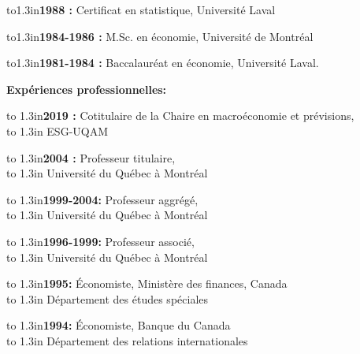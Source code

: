 \noindent\hbox to1.3in{\bf 1988 :\hfill} Certificat en statistique, Universit\'e Laval

\noindent\hbox to1.3in{\bf1984-1986 :\hfill} M.Sc. en \'economie, Universit\'e de Montr\'eal

\noindent\hbox to1.3in{\bf1981-1984 :\hfill} Baccalaur\'eat en \'economie, Universit\'e Laval.

\vspace{.5 cm}



\centerline{\bf Exp\'eriences professionnelles:}
\vspace{.5 cm}

\noindent\hbox to 1.3in{\bf 2019     :\hfill} Cotitulaire de la Chaire en macro\'economie et pr\'evisions,\\
\noindent\hbox to 1.3in{\hfill} ESG-UQAM

\noindent\hbox to 1.3in{\bf 2004     :\hfill} Professeur titulaire,\\
\noindent\hbox to 1.3in{\hfill} Universit\'e du Qu\'ebec \`a Montr\'eal


\noindent\hbox to 1.3in{\bf 1999-2004:\hfill} Professeur aggr\'eg\'e,\\
\noindent\hbox to 1.3in{\hfill} Universit\'e du Qu\'ebec \`a Montr\'eal

\noindent\hbox to 1.3in{\bf 1996-1999:\hfill} Professeur associ\'e,\\
\noindent\hbox to 1.3in{\hfill} Universit\'e du Qu\'ebec \`a Montr\'eal


\noindent\hbox to 1.3in{\bf 1995:\hfill} \'Economiste, Minist\`ere des finances, Canada\\
\noindent\hbox to 1.3in{\hfill} D\'epartement des \'etudes sp\'eciales


\noindent\hbox to 1.3in{\bf 1994:\hfill} \'Economiste, Banque du Canada\\
\noindent\hbox to 1.3in{\hfill} D\'epartement des relations internationales




\newpage

\vspace{.3 cm}

